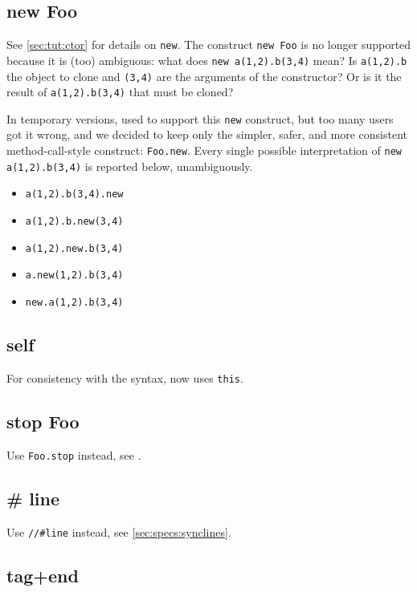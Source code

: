 \subsection{new Foo}

See \autoref{sec:tut:ctor} for details on \lstinline{new}.  The construct
\lstinline{new Foo} is no longer supported because it is (too) ambiguous:
what does \lstinline{new a(1,2).b(3,4)} mean?  Is
\lstinline{a(1,2).b} the object to clone and \lstinline{(3,4)} are the
arguments of the constructor?  Or is it the result of
\lstinline{a(1,2).b(3,4)} that must be cloned?

In temporary versions,  used to support this \lstinline{new} construct,
but too many users got it wrong, and we decided to keep only the
simpler, safer, and more consistent method-call-style construct:
\lstinline{Foo.new}.  Every single possible interpretation of
\lstinline{new a(1,2).b(3,4)} is reported below, unambiguously.
\begin{itemize}
\item \lstinline{a(1,2).b(3,4).new}
\item \lstinline{a(1,2).b.new(3,4)}
\item \lstinline{a(1,2).new.b(3,4)}
\item \lstinline{a.new(1,2).b(3,4)}
\item \lstinline{new.a(1,2).b(3,4)}
\end{itemize}

\subsection{self}
For consistency with the \Cxx syntax, \us now uses \lstinline{this}.

\subsection{stop Foo}

Use \lstinline{Foo.stop} instead, see .

\subsection{\# line}

Use \lstinline{//#line} instead, see \autoref{sec:specs:synclines}.

\subsection{tag+end}


